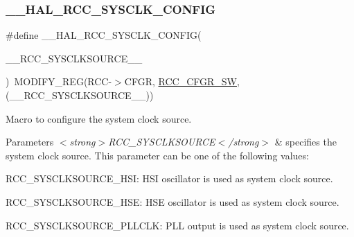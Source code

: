 \subsubsection{\texorpdfstring{\_\_HAL\_RCC\_SYSCLK\_CONFIG}{\_\_HAL\_RCC\_SYSCLK\_CONFIG}}
{\footnotesize\ttfamily \#define \+\_\+\+\_\+\+H\+A\+L\+\_\+\+R\+C\+C\+\_\+\+S\+Y\+S\+C\+L\+K\+\_\+\+C\+O\+N\+F\+IG(\begin{DoxyParamCaption}\item[{}]{\+\_\+\+\_\+\+R\+C\+C\+\_\+\+S\+Y\+S\+C\+L\+K\+S\+O\+U\+R\+C\+E\+\_\+\+\_\+ }\end{DoxyParamCaption})~M\+O\+D\+I\+F\+Y\+\_\+\+R\+EG(R\+CC-\/$>$C\+F\+GR, \mbox{\hyperlink{group___peripheral___registers___bits___definition_ga0eea5e5f7743a7e8995b8beeb18355c1}{R\+C\+C\+\_\+\+C\+F\+G\+R\+\_\+\+SW}}, (\+\_\+\+\_\+\+R\+C\+C\+\_\+\+S\+Y\+S\+C\+L\+K\+S\+O\+U\+R\+C\+E\+\_\+\+\_\+))}



Macro to configure the system clock source. 


\begin{DoxyParams}{Parameters}
{\em $<$strong$>$\+R\+C\+C\+\_\+\+S\+Y\+S\+C\+L\+K\+S\+O\+U\+R\+C\+E$<$/strong$>$} & specifies the system clock source. This parameter can be one of the following values\+:
\begin{DoxyItemize}
\item R\+C\+C\+\_\+\+S\+Y\+S\+C\+L\+K\+S\+O\+U\+R\+C\+E\+\_\+\+H\+SI\+: H\+SI oscillator is used as system clock source.
\item R\+C\+C\+\_\+\+S\+Y\+S\+C\+L\+K\+S\+O\+U\+R\+C\+E\+\_\+\+H\+SE\+: H\+SE oscillator is used as system clock source.
\item R\+C\+C\+\_\+\+S\+Y\+S\+C\+L\+K\+S\+O\+U\+R\+C\+E\+\_\+\+P\+L\+L\+C\+LK\+: P\+LL output is used as system clock source. 
\end{DoxyItemize}\\
\hline
\end{DoxyParams}
